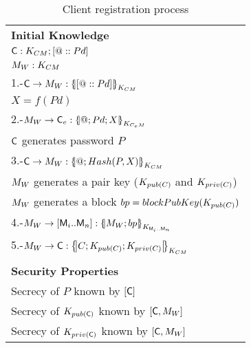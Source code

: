 \begin{table}[htb]
\footnotesize
\begin{center}
\caption{Client registration process}
\label{table:reqSessKey}
\begin{tabular}{|l|}
\hline
\textbf{Initial Knowledge}                                                        \\
$\textsf{C}:K_{CM}; [@::Pd]$                                                    \\
$M_{W}: K_{CM}$                                                            \\ \hline \hline
1.-$\Client\rightarrow \ServerW:\fat{[@::Pd]}_{K_{\client\serverW}}$                     \\
\hspace{5mm} $X=f(Pd) $                           \\ 
2.-$\ServerW\rightarrow \Client_e: \fat{@\lnk Pd \lnk X}_{K_{\client_e\serverW}} $                  \\ 
\hspace{5mm} $\textsf{C}$ generates password $P$                          \\  
3.-$\Client\rightarrow \ServerW:\fat{@\lnk Hash(P,X)}_{K_{\client\serverW}}$                 \\  
\hspace{5mm} $M_{W}$ generates a pair key ($K_{pub(C)}$ and $K_{priv(C)}$)\\
\hspace{5mm} $M_{W}$ generates a block $bp = blockPubKey(K_{pub(C)})$\\
4.-$\ServerW\rightarrow [\Server_i .. \Server_n]: \fat{\ServerW \lnk bp}_{K_{\Server_i .. \Server_n}}$  \\  
5.-$\ServerW\rightarrow \Client: \fat{C \lnk K_{pub(\client)}\lnk K_{priv(\client)}}_{K_{\client\serverW}}$          \\\\            \hline
\textbf{Security Properties}                        \\
\hspace{5mm}Secrecy of $P$ known by $[\textsf{C}]$ \\
\hspace{5mm}Secrecy of $K_{pub(\textsf{C})}$ known by $[\textsf{C},M_{W}]$ \\
\hspace{5mm}Secrecy of $K_{priv(\textsf{C})}$ known by $[\textsf{C},M_{W}]$ \\\hline \hline 
\end{tabular}
\end{center}
\end{table}
\normalsize

